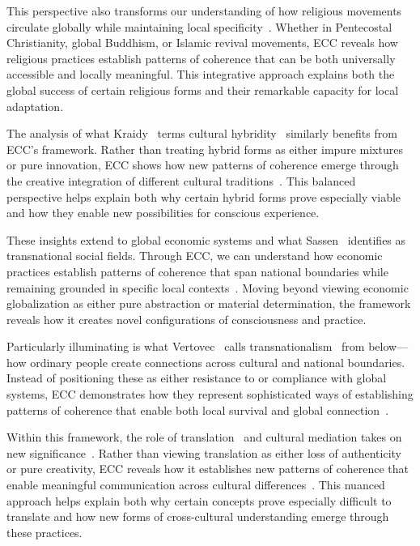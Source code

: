 This perspective also transforms our understanding of how religious movements~ circulate globally while maintaining local specificity~\cite{comaroff2009ethnicity}. Whether in Pentecostal Christianity, global Buddhism, or Islamic revival movements, ECC reveals how religious practices establish patterns of coherence that can be both universally accessible and locally meaningful. This integrative approach explains both the global success of certain religious forms and their remarkable capacity for local adaptation.

The analysis of what Kraidy~\cite{kraidy2005hybridity} terms cultural hybridity~ similarly benefits from ECC's framework. Rather than treating hybrid forms as either impure mixtures or pure innovation, ECC shows how new patterns of coherence emerge through the creative integration of different cultural traditions~\cite{warnier2007globalization}. This balanced perspective helps explain both why certain hybrid forms prove especially viable and how they enable new possibilities for conscious experience.

These insights extend to global economic systems and what Sassen~\cite{sassen2007sociology} identifies as transnational social fields. Through ECC, we can understand how economic practices establish patterns of coherence that span national boundaries while remaining grounded in specific local contexts~\cite{moore2015capitalism, escobar2018designs}. Moving beyond viewing economic globalization as either pure abstraction or material determination, the framework reveals how it creates novel configurations of consciousness and practice.

Particularly illuminating is what Vertovec~\cite{vertovec2009transnationalism} calls transnationalism~ from below---how ordinary people create connections across cultural and national boundaries. Instead of positioning these as either resistance to or compliance with global systems, ECC demonstrates how they represent sophisticated ways of establishing patterns of coherence that enable both local survival and global connection~\cite{czarniawska2005global}.

Within this framework, the role of translation~ and cultural mediation takes on new significance~\cite{tomlinson1999globalization}. Rather than viewing translation as either loss of authenticity or pure creativity, ECC reveals how it establishes new patterns of coherence that enable meaningful communication across cultural differences~\cite{robertson1992globalization}. This nuanced approach helps explain both why certain concepts prove especially difficult to translate and how new forms of cross-cultural understanding emerge through these practices.

